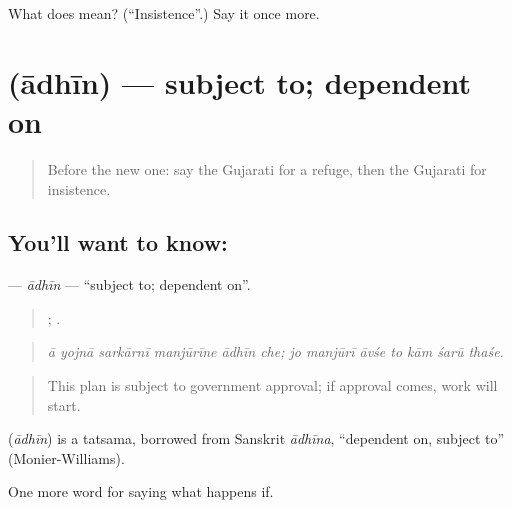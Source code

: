 \begin{tcolorbox}[breakable,colback=teal!4,colframe=teal!35!black,title={Before you move on}]
What does  mean? (\textquotedblleft{}Insistence\textquotedblright{}.) Say it once more.
\end{tcolorbox}
\section[\texorpdfstring{\gu{આધીન} (ādhīn)}{આધીન (ādhīn)}]{ (ādhīn) — subject to; dependent on}

\label{lesson:GU-C386-adhin}



\begin{quote}
Before the new one: say the Gujarati for a refuge, then the Gujarati for insistence.
\end{quote}

\subsection*{You'll want to know: }
\textbf{} — \emph{ādhīn} — \textquotedblleft{}subject to; dependent on\textquotedblright{}.

\begin{quote}
     ;       .
\end{quote}

\begin{quote}
\emph{ā yojnā sarkārnī manjūrīne ādhīn che; jo manjūrī āvśe to kām śarū thaśe.}
\end{quote}

\begin{quote}
This plan is subject to government approval; if approval comes, work will start.
\end{quote}

\begin{cousinweb}
\textbf{} (\emph{ādhīn}) is a tatsama, borrowed from Sanskrit \emph{ādhīna}, \textquotedblleft{}dependent on, subject to\textquotedblright{} (Monier-Williams).
\end{cousinweb}

\begin{grammarlens}[title={What you've built}]
One more word for saying what happens if.
\end{grammarlens}


